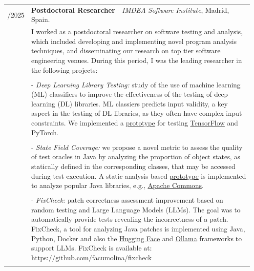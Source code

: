\documentclass[a4paper,10pt]{article} %
\begin{document}
\begin{longtable}{>{\raggedleft\arraybackslash}p{} p{}}
2022/2025 & \textbf{Postdoctoral Researcher} - \textit{IMDEA Software Institute}, Madrid, Spain. \\
& I worked as a postdoctoral researcher on software testing and analysis, which included developing and implementing novel program analysis techniques, and disseminating our research on top tier software engineering venues. During this period, I was the leading researcher in the following projects: \\ & \\
& - \textit{Deep Learning Library Testing:} study of the use of machine learning (ML) classifiers to improve the effectiveness of the testing of deep learning (DL) libraries. ML classiers predicts input validity, a key aspect in the testing of DL libraries, as they often have complex input constraints. We implemented a \href{https://sites.google.com/view/ml4dllconstraints}{prototype} for testing \href{https://www.tensorflow.org/}{TensorFlow} and \href{https://pytorch.org/}{PyTorch}. \\ & \\

& - \textit{State Field Coverage:} we propose a novel metric to assess the quality of test oracles in Java by analyzing the proportion of object states, as statically defined in the corresponding classes, that may be accessed during test execution. A static analysis-based \href{https://zenodo.org/records/17255287}{prototype} is implemented to analyze popular Java libraries, e.g., \href{https://commons.apache.org/}{Apache Commons}. \\ & \\
& - \textit{FixCheck:} patch correctness assessment improvement based on random testing and Large Language Models (LLMs). The goal was to automatically provide tests revealing the incorrectness of a patch. FixCheck, a tool for analyzing Java patches is implemented using Java, Python, Docker and also the \href{https://huggingface.co/}{Hugging Face} and \href{https://ollama.com/}{Ollama} frameworks to support LLMs. FixCheck is available at: \href{https://github.com/facumolina/fixcheck}{https://github.com/facumolina/fixcheck} \\ & \\


\end{longtable}
\end{document}
